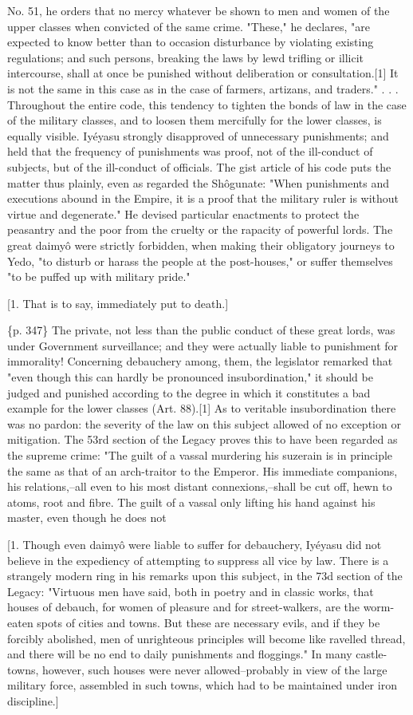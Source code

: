 No. 51, he orders that no mercy whatever be shown to men and women of the upper classes when convicted of the same crime. "These," he declares, "are expected to know better than to occasion disturbance by violating existing regulations; and such persons, breaking the laws by lewd trifling or illicit intercourse, shall at once be punished without deliberation or consultation.[1] It is not the same in this case as in the case of farmers, artizans, and traders." . . . Throughout the entire code, this tendency to tighten the bonds of law in the case of the military classes, and to loosen them mercifully for the lower classes, is equally visible. Iyéyasu strongly disapproved of unnecessary punishments; and held that the frequency of punishments was proof, not of the ill-conduct of subjects, but of the ill-conduct of officials. The gist article of his code puts the matter thus plainly, even as regarded the Shôgunate: "When punishments and executions abound in the Empire, it is a proof that the military ruler is without virtue and degenerate." He devised particular enactments to protect the peasantry and the poor from the cruelty or the rapacity of powerful lords. The great daimyô were strictly forbidden, when making their obligatory journeys to Yedo, "to disturb or harass the people at the post-houses," or suffer themselves "to be puffed up with military pride."

[1. That is to say, immediately put to death.]

\{p. 347\} The private, not less than the public conduct of these great lords, was under Government surveillance; and they were actually liable to punishment for immorality! Concerning debauchery among, them, the legislator remarked that "even though this can hardly be pronounced insubordination," it should be judged and punished according to the degree in which it constitutes a bad example for the lower classes (Art. 88).[1] As to veritable insubordination there was no pardon: the severity of the law on this subject allowed of no exception or mitigation. The 53rd section of the Legacy proves this to have been regarded as the supreme crime: "The guilt of a vassal murdering his suzerain is in principle the same as that of an arch-traitor to the Emperor. His immediate companions, his relations,--all even to his most distant connexions,--shall be cut off, hewn to atoms, root and fibre. The guilt of a vassal only lifting his hand against his master, even though he does not

[1. Though even daimyô were liable to suffer for debauchery, Iyéyasu did not believe in the expediency of attempting to suppress all vice by law. There is a strangely modern ring in his remarks upon this subject, in the 73d section of the Legacy: "Virtuous men have said, both in poetry and in classic works, that houses of debauch, for women of pleasure and for street-walkers, are the worm-eaten spots of cities and towns. But these are necessary evils, and if they be forcibly abolished, men of unrighteous principles will become like ravelled thread, and there will be no end to daily punishments and floggings." In many castle-towns, however, such houses were never allowed--probably in view of the large military force, assembled in such towns, which had to be maintained under iron discipline.]

